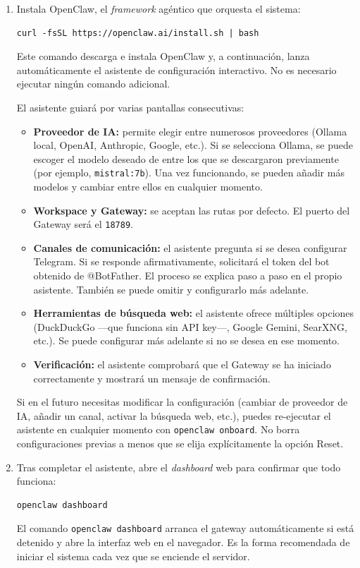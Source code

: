 \begin{enumerate}
    \item Instala OpenClaw, el \textit{framework} agéntico que orquesta el sistema:
\begin{verbatim}
curl -fsSL https://openclaw.ai/install.sh | bash
\end{verbatim}
    Este comando descarga e instala OpenClaw y, a continuación, lanza automáticamente el asistente de configuración interactivo. No es necesario ejecutar ningún comando adicional.

    El asistente guiará por varias pantallas consecutivas:

    \begin{itemize}
        \item \textbf{Proveedor de IA:} permite elegir entre numerosos proveedores (Ollama local, OpenAI, Anthropic, Google, etc.). Si se selecciona Ollama, se puede escoger el modelo deseado de entre los que se descargaron previamente (por ejemplo, \texttt{mistral:7b}). Una vez funcionando, se pueden añadir más modelos y cambiar entre ellos en cualquier momento.

        \item \textbf{Workspace y Gateway:} se aceptan las rutas por defecto. El puerto del Gateway será el \texttt{18789}.

        \item \textbf{Canales de comunicación:} el asistente pregunta si se desea configurar Telegram. Si se responde afirmativamente, solicitará el token del bot obtenido de @BotFather. El proceso se explica paso a paso en el propio asistente. También se puede omitir y configurarlo más adelante.

        \item \textbf{Herramientas de búsqueda web:} el asistente ofrece múltiples opciones (DuckDuckGo ---que funciona sin API key---, Google Gemini, SearXNG, etc.). Se puede configurar más adelante si no se desea en ese momento.

        \item \textbf{Verificación:} el asistente comprobará que el Gateway se ha iniciado correctamente y mostrará un mensaje de confirmación.
    \end{itemize}

    Si en el futuro necesitas modificar la configuración (cambiar de proveedor de IA, añadir un canal, activar la búsqueda web, etc.), puedes re-ejecutar el asistente en cualquier momento con \texttt{openclaw onboard}. No borra configuraciones previas a menos que se elija explícitamente la opción Reset.

    \item Tras completar el asistente, abre el \textit{dashboard} web para confirmar que todo funciona:
\begin{verbatim}
openclaw dashboard
\end{verbatim}
    El comando \texttt{openclaw dashboard} arranca el gateway automáticamente si está detenido y abre la interfaz web en el navegador. Es la forma recomendada de iniciar el sistema cada vez que se enciende el servidor.
\end{enumerate}

